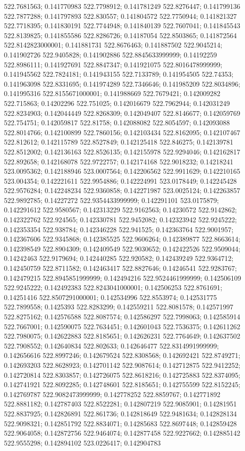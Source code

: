 522.7681563; 0.141770983 522.7798912; 0.141781249 522.8276447; 0.141799136 522.7877288; 0.141797893 522.830557; 0.141804572 522.7750944; 0.141821327 522.7718395; 0.141830191 522.7744948; 0.141840139 522.7607041; 0.141845543 522.8139825; 0.141855586 522.8286726; 0.14187054 522.8503865; 0.141872564 522.8142823000001; 0.141881731 522.8676463; 0.141887502 522.9045214; 0.141902726 522.9405828; 0.141902886 522.8845633999999; 0.14192259 522.8986111; 0.141927691 522.8847347; 0.141921075 522.8016478999999; 0.141945562 522.7824181; 0.141943155 522.7133789; 0.141954505 522.74353; 0.141963098 522.8331695; 0.141974289 522.7346646; 0.141985209 522.8034896; 0.141995316 522.8155671000001; 0.141988669 522.7679421; 0.142009282 522.715863; 0.14202296 522.751025; 0.142016679 522.7962944; 0.142031249 522.8234903; 0.142044449 522.8268309; 0.142049407 522.8146677; 0.142059769 522.754751; 0.142059817 522.81758; 0.142088082 522.8054597; 0.142093088 522.8014766; 0.142100899 522.7860156; 0.142103434 522.8162095; 0.142107467 522.812612; 0.142115789 522.8527849; 0.142125418 522.846275; 0.142139781 522.8512002; 0.142136163 522.8526135; 0.142155978 522.9294046; 0.142162817 522.892658; 0.142168078 522.9722757; 0.142174168 522.9018232; 0.14218241 523.0095362; 0.142188946 523.0007564; 0.142206562 522.9911629; 0.142210165 523.004354; 0.142221611 522.9954886; 0.142224991 523.0178449; 0.142245428 522.9576284; 0.142248234 522.9360858; 0.142271987 523.0025124; 0.142263857 522.9892785; 0.14227272 522.9354433999999; 0.142291101 523.0175879; 0.142291612 522.9580567; 0.142313229 522.9162563; 0.14230572 522.9142862; 0.142322762 522.924565; 0.142330781 522.9452082; 0.142323942 522.9245222; 0.142353354 522.938784; 0.142346228 522.941525; 0.142363764 522.9001957; 0.142367606 522.9345868; 0.142385525 522.9606264; 0.142389877 522.8663614; 0.142398549 522.8904309; 0.142409549 522.9030652; 0.142422526 522.9509044; 0.14242463 522.9179694; 0.142440285 522.920582; 0.142439249 522.9364712; 0.142450759 522.8711582; 0.142463417 522.8827646; 0.14246541 522.9283767; 0.142479215 522.8945851999999; 0.142494216 522.9524461999999; 0.142506109 522.9245222; 0.142492383 522.8243041000001; 0.142506253 522.8761691; 0.14251416 522.8507291000001; 0.142534996 522.8553974; 0.142531775 522.7899558; 0.1425393 522.8283299; 0.142559211 522.8081578; 0.142571997 522.8275162; 0.142576588 522.8087574; 0.142586297 522.7998063; 0.142585914 522.7667001; 0.142590075 522.7634451; 0.142601043 522.7536375; 0.142611262 522.7980075; 0.142622883 522.8185651; 0.142626231 522.7764649; 0.142637502 522.7908552; 0.142640834 522.802633; 0.142646477 522.8314991999999; 0.142656616 522.8997246; 0.142679524 522.8308568; 0.142692421 522.8749271; 0.142693203 522.8628923; 0.142701142 522.9087614; 0.142712875 522.9412252; 0.142720814 522.8303857; 0.142726075 522.8618216; 0.142725883 522.8374095; 0.142741921 522.8092285; 0.142748601 522.8185651; 0.142755599 522.8152245; 0.142769787 522.9082473999999; 0.142778252 522.8859767; 0.142771892 522.8881182; 0.142787403 522.8522281; 0.142807219 522.9085901; 0.14281951 522.8837925; 0.142826891 522.861736; 0.142818649 522.9481634; 0.142828134 522.9098321; 0.142851792 522.8834071; 0.14285683 522.8697448; 0.142859428 522.9064058; 0.142872756 522.9464074; 0.142877458 522.9227662; 0.142885142 522.9555298; 0.142894102 523.0226417; 0.142904783 